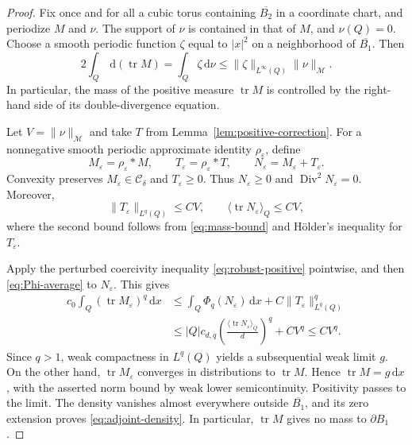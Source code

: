 \documentclass[11pt,a4paper,reqno]{amsart}
\theoremstyle{plain}
\theoremstyle{remark}
\numberwithin{equation}{section}
\newcommand{\Cdelta}{\mathcal C_\delta}
\newcommand{\dd}{\,\mathrm d}
\newcommand{\norm}[1]{\lVert#1\rVert}
\newcommand{\avg}[1]{\langle#1\rangle_Q}
\newcommand{\TV}[1]{\norm{#1}_{\mathcal M}}
\DeclareMathOperator{\tr}{tr}
\DeclareMathOperator{\Div}{Div}
\begin{document}
\begin{proof}
Fix once and for all a cubic torus containing $\overline{B_2}$ in a coordinate chart, and periodize $M$ and $\nu$. The support of $\nu$ is contained in that of $M$, and $\nu(Q)=0$. Choose a smooth periodic function $\zeta$ equal to $|x|^2$ on a neighborhood of $\overline{B_1}$. Then
\begin{equation}\label{eq:mass-bound}
 2\int_Q\dd(\tr M)
 =\int_Q\zeta\dd\nu
 \le\norm{\zeta}_{L^\infty(Q)}\TV{\nu}.
\end{equation}
In particular, the mass of the positive measure $\tr M$ is controlled by the right-hand side of its double-divergence equation.

Let $V=\TV{\nu}$ and take $T$ from Lemma~\ref{lem:positive-correction}. For a nonnegative smooth periodic approximate identity $\rho_\varepsilon$, define
\[
 M_\varepsilon=\rho_\varepsilon*M,\qquad
 T_\varepsilon=\rho_\varepsilon*T,\qquad
 N_\varepsilon=M_\varepsilon+T_\varepsilon.
\]
Convexity preserves $M_\varepsilon\in\Cdelta$ and $T_\varepsilon\ge0$. Thus $N_\varepsilon\ge0$ and $\Div^2N_\varepsilon=0$. Moreover,
\[
 \norm{T_\varepsilon}_{L^q(Q)}\le CV,
 \qquad \avg{\tr N_\varepsilon}\le CV,
\]
where the second bound follows from \eqref{eq:mass-bound} and H\"older's inequality for $T_\varepsilon$.

Apply the perturbed coercivity inequality \eqref{eq:robust-positive} pointwise, and then \eqref{eq:Phi-average} to $N_\varepsilon$. This gives
\begin{align*}
 c_0\int_Q(\tr M_\varepsilon)^q\dd x
 &\le\int_Q\Phi_q(N_\varepsilon)\dd x
          +C\norm{T_\varepsilon}_{L^q(Q)}^q\\
 &\le |Q|c_{d,q}\left(\frac{\avg{\tr N_\varepsilon}}d\right)^q
          +CV^q
 \le CV^q.
\end{align*}
Since $q>1$, weak compactness in $L^q(Q)$ yields a subsequential weak limit $g$. On the other hand, $\tr M_\varepsilon$ converges in distributions to $\tr M$. Hence $\tr M=g\dd x$, with the asserted norm bound by weak lower semicontinuity. Positivity passes to the limit. The density vanishes almost everywhere outside $\overline{B_1}$, and its zero extension proves \eqref{eq:adjoint-density}. In particular, $\tr M$ gives no mass to $\partial B_1$.
\end{proof}
\end{document}
